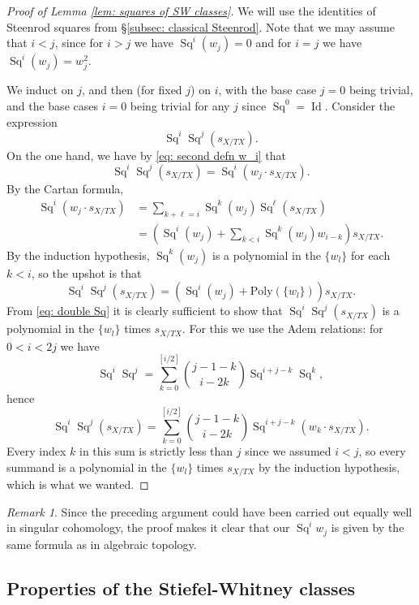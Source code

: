\documentclass[10pt, reqno]{amsart}
\numberwithin{equation}{subsection}
\DeclareMathOperator{\Id}{Id}
\DeclareMathOperator{\Sq}{Sq}
\theoremstyle{remark}
\newtheorem{remark}[thm]{Remark}
\begin{document}
\begin{proof}[Proof of Lemma \ref{lem: squares of SW classes}]
We will use the identities of Steenrod squares from \S \ref{subsec: classical Steenrod}. Note that we may assume that $i <j$, since for $i>j$ we have $\Sq^i (w_j) = 0$ and for $i = j$ we have $\Sq^i(w_j) = w_j^2$.

We induct on $j$, and then (for fixed $j$) on $i$, with the base case $j=0$ being trivial, and the base cases $i=0$ being trivial for any $j$ since $\Sq^0 = \Id$. Consider the expression 
\[
\Sq^i \Sq^j (s_{X/TX}).
\] 
On the one hand, we have by \eqref{eq: second defn w_i} that 
\[
\Sq^i \Sq^j (s_{X/TX}) = \Sq^i(w_j \cdot s_{X/TX}).
\]
By the Cartan formula,
\begin{align*}
\Sq^i(w_j \cdot s_{X/TX}) &= \sum_{k+\ell=i} \Sq^k(w_j) \Sq^{\ell} (s_{X/TX}) \\
&=  \left( \Sq^i(w_j) + \sum_{k<i} \Sq^k (w_j) w_{i-k}   \right) s_{X/TX}.
\end{align*}
By the induction hypothesis, $\Sq^k(w_j)$ is a polynomial in the $\{w_l\}$ for each $k<i$, so the upshot is that
\begin{equation}\label{eq:  double Sq}
\Sq^i \Sq^j (s_{X/TX}) = (\Sq^i(w_j) + \text{Poly}(\{w_l\}))s_{X/TX}.
\end{equation}
From \eqref{eq:  double Sq} it is clearly sufficient to show that $\Sq^i \Sq^j (s_{X/TX})$ is a polynomial in the $\{w_l\}$ times $s_{X/TX}$. For this we use the Adem relations: for $0<i<2j$ we have 
\[
\Sq^i\Sq^j = \sum_{k=0}^{[i/2]} \binom{j-1-k}{i-2k} \Sq^{i+j-k} \Sq^k,
\]
hence 
\[
\Sq^i \Sq^j (s_{X/TX}) = \sum_{k=0}^{[i/2]} \binom{j-1-k}{i-2k} \Sq^{i+j-k} (w_k \cdot s_{X/TX}).
\]
Every index $k$ in this sum is strictly less than $j$ since we assumed $i<j$, so every summand is a polynomial in the $\{w_l\}$ times $s_{X/TX}$ by the induction hypothesis, which is what we wanted.
\end{proof}

\begin{remark}
Since the preceding argument could have been carried out equally well in singular cohomology, the proof makes it clear that our $\Sq^i w_j$ is given by the same formula as in algebraic topology. 
\end{remark}

\subsection{Properties of the Stiefel-Whitney classes}\label{SWproperties}
\end{document}
